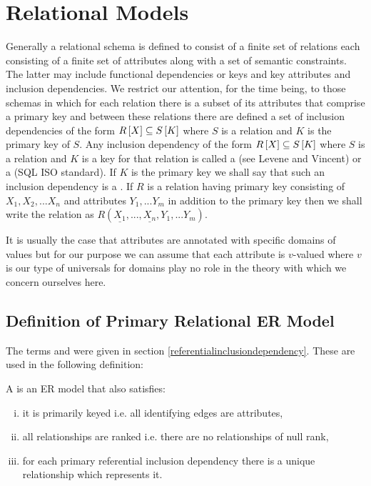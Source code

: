 \section{Relational Models}
Generally a relational schema is defined to consist of a finite set of relations each consisting of a
finite set of attributes along with a set of semantic constraints. The latter may include functional dependencies or keys and key attributes and inclusion dependencies.  We restrict our attention, for the time being, to those schemas in which for each relation there is a subset of its attributes that comprise a primary key and between these relations there are defined  a set of inclusion dependencies of the 
form $R\left[X\right]\subseteq S\left[K\right]$ where $S$ is a relation and $K$ is the primary key of $S$.
Any inclusion dependency of the form $R\left[X\right]\subseteq S\left[K\right]$ where $S$ is a relation and $K$ is a key for that relation is called a  (see Levene and Vincent) or a  (SQL ISO standard).
If $K$ is the primary key we shall say that such an inclusion dependency is a . If $R$ is a relation having primary key consisting
of $X_1,X_2,...X_n$ and attributes $Y_1,...Y_m$ in addition to the primary key 
 then we shall write the relation as $R(\underline{X_1},...,\underline{X_n},Y_1,...Y_m)$.

It is usually the case that attributes are annotated with specific domains of values but for our purpose we can assume that each attribute is $v$-valued where $v$ is our type of universals for domains play no role in the theory with which we concern ourselves here.
\subsection{Definition of Primary Relational ER Model}
The terms  and 
 were given in 
section \ref{referentialinclusiondependency}. These are used in the following definition:
\begin{definition}
\noindent 
A  is an  ER model that also satisfies:
\begin{enumerate}[(i)]
\item
it is primarily keyed i.e. all identifying edges are attributes, 
\item
all relationships are ranked i.e. there are no relationships of null rank,
\item 
for each primary referential inclusion dependency there is a unique relationship which represents it.
\end{enumerate} 
\end{definition}

